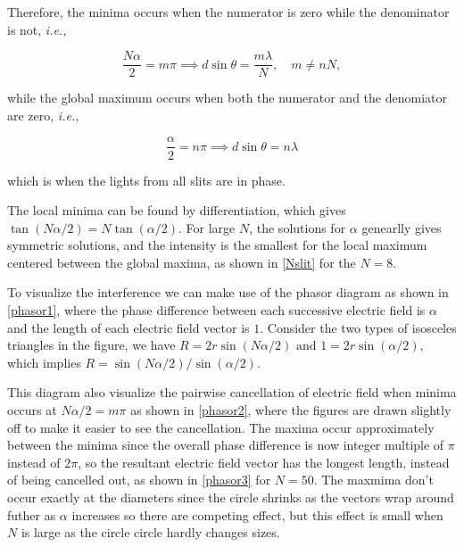\documentclass[english,a4paper,12pt]{report}
\begin{document}
Therefore, the minima occurs when the numerator is zero while the denominator is not, \textit{i.e.,} 

\begin{equation}
    \frac{N\alpha }{2} = m\pi \implies d \sin \theta = \frac{m \lambda }{N} , \quad m \neq nN,
\end{equation}

while the global maximum occurs when both the numerator and the denomiator are zero, \textit{i.e.,}

\begin{equation}
    \frac{\alpha }{2} = n \pi \implies d\sin \theta = n\lambda  
\end{equation}

which is when the lights from all slits are in phase. 

The local minima can be found by differentiation, which gives \(\tan (N\alpha /2) = N\tan (\alpha /2)\). For large \(N\), the solutions for \(\alpha \) genearlly gives symmetric solutions, and the intensity is the smallest for the local maximum centered between the global maxima, as shown in \cref{Nslit} for the \(N=8\).


To visualize the interference we can make use of the phasor diagram as shown in \cref{phasor1}, where the phase difference between each successive electric field is \(\alpha \) and the length of each electric field vector is \(1\). Consider the two types of isosceles triangles in the figure, we have \(R = 2r \sin (N \alpha /2) \text { and } 1 = 2r \sin (\alpha /2)\), which implies \(R = \sin (N \alpha /2)/\sin (\alpha /2)\). 

This diagram also visualize the pairwise cancellation of electric field when minima occurs at \(N \alpha /2 = m\pi \) as shown in \cref{phasor2}, where the figures are drawn slightly off to make it easier to see the cancellation. The maxima occur approximately between the minima since the overall phase difference is now integer multiple of \(\pi \) instead of \(2\pi \), so the resultant electric field vector has the longest length, instead of being cancelled out, as shown in \cref{phasor3} for \(N= 50\). The maxmima don't occur exactly at the diameters since the circle shrinks as the vectors wrap around futher as \(\alpha \) increases so there are competing effect, but this effect is small when \(N\) is large as the circle circle hardly changes sizes.  
\end{document}
